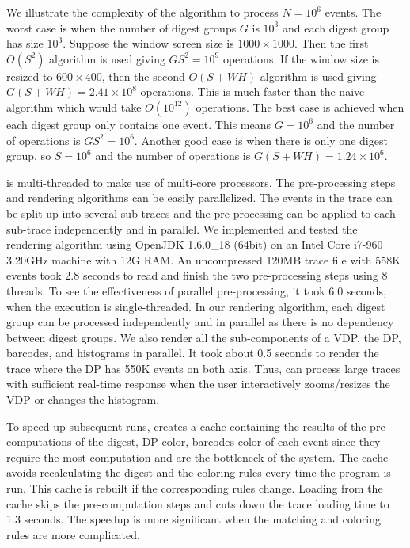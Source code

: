 We illustrate the complexity of the algorithm to process $N=10^6$ events.
The worst case is when the number of digest groups $G$ is $10^3$
and each digest group has size $10^3$.
Suppose the window screen size is $1000\times 1000$.
Then the first $O(S^2)$ algorithm is used giving $GS^2 = 10^9$ operations.
If the window size is resized to $600\times 400$, then
the second $O(S+W H)$ algorithm is used giving $G(S+WH)=2.41\times 10^8$ operations.
This is much faster than the naive algorithm which would take $O(10^{12})$
operations.
The best case is achieved when each digest group only contains one event.
This means $G = 10^6$ and the number of operations
is $G S^2=10^6$.
Another good case is when there is only one digest group,
so $S=10^6$ and the number of operations is $G(S + WH)=1.24\times10^6$.

 is multi-threaded to make use of multi-core processors.
The pre-processing steps and rendering algorithms can be easily parallelized.
The events in the trace can be split up into several sub-traces and 
the pre-processing can be applied to each sub-trace
independently and in parallel.
We implemented and tested the rendering algorithm using
OpenJDK 1.6.0\_18 (64bit) on an Intel Core i7-960 3.20GHz
machine with 12G RAM.
An uncompressed 120MB trace file with 558K events took 2.8 seconds
to read and finish the two pre-processing steps using 8 threads.
To see the effectiveness of parallel pre-processing, it took 6.0 seconds,
when the execution is single-threaded.
In our rendering algorithm, each digest group can be processed
independently and in parallel as there is no dependency between digest groups.
We also render all the sub-components
of a VDP, the DP, barcodes, and histograms in parallel.
It took about 0.5 seconds to render the trace where the DP has 550K events
on both axis.
Thus,  can process large traces with sufficient real-time response
when the user interactively zooms/resizes the VDP or changes the histogram.

To speed up subsequent runs,  creates a cache containing the results
of the pre-computations of the digest, DP color, barcodes color
of each event since they require the most computation
and are the bottleneck of the system. The cache avoids recalculating the
digest and the coloring rules every time the program is run.
This cache is rebuilt if the corresponding rules change.
Loading from the cache skips the pre-computation steps and
cuts down the trace loading time to 1.3 seconds.
The speedup is more significant when the matching and coloring rules are
more complicated.

